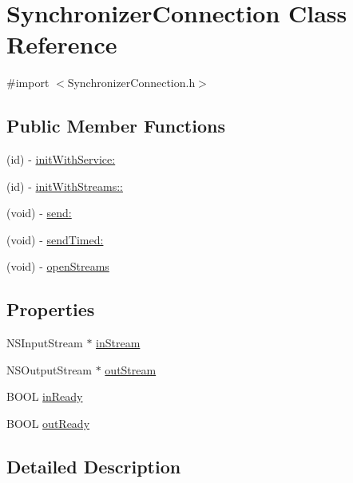 \hypertarget{interface_synchronizer_connection}{
\section{SynchronizerConnection Class Reference}
\label{interface_synchronizer_connection}
}


{\ttfamily \#import $<$SynchronizerConnection.h$>$}

\subsection*{Public Member Functions}
\begin{DoxyCompactItemize}
\item 
(id) -\/ \hyperlink{interface_synchronizer_connection_a85d039f4fe918b4ab91b90c1bac883f1}{initWithService:}
\item 
(id) -\/ \hyperlink{interface_synchronizer_connection_a97b996ff087bec3e20030ea7a28ae97c}{initWithStreams::}
\item 
(void) -\/ \hyperlink{interface_synchronizer_connection_a939a6f91cc8242331d9667962c0bee25}{send:}
\item 
(void) -\/ \hyperlink{interface_synchronizer_connection_ab99a267a91e1318c7cbb20a5b70ea644}{sendTimed:}
\item 
(void) -\/ \hyperlink{interface_synchronizer_connection_a5d689c3d763d3d97afd81ce370fd36a2}{openStreams}
\end{DoxyCompactItemize}
\subsection*{Properties}
\begin{DoxyCompactItemize}
\item 
NSInputStream $\ast$ \hyperlink{interface_synchronizer_connection_a6518f57e11a87d0fa1592f43e6c09ef6}{inStream}
\item 
NSOutputStream $\ast$ \hyperlink{interface_synchronizer_connection_a40bb251ce886c4b07fe1c1e4c5107eeb}{outStream}
\item 
BOOL \hyperlink{interface_synchronizer_connection_af9691c42e72c2c15aee4012b5de79aae}{inReady}
\item 
BOOL \hyperlink{interface_synchronizer_connection_a64d91b9747d4876f20415079bb9d9f7f}{outReady}
\end{DoxyCompactItemize}


\subsection{Detailed Description}


